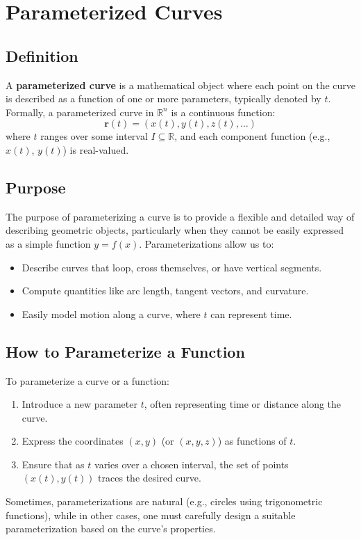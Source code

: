 \section{Parameterized Curves}

\subsection{Definition}
A \textbf{parameterized curve} is a mathematical object where each point on the curve is described as a function of one or more parameters, typically denoted by \( t \). Formally, a parameterized curve in \( \mathbb{R}^n \) is a continuous function:
\[
\mathbf{r}(t) = (x(t), y(t), z(t), \ldots)
\]
where \( t \) ranges over some interval \( I \subseteq \mathbb{R} \), and each component function (e.g., \( x(t) \), \( y(t) \)) is real-valued.

\subsection{Purpose}
The purpose of parameterizing a curve is to provide a flexible and detailed way of describing geometric objects, particularly when they cannot be easily expressed as a simple function \( y = f(x) \). Parameterizations allow us to:
\begin{itemize}[label=\(-\)]
    \item Describe curves that loop, cross themselves, or have vertical segments.
    \item Compute quantities like arc length, tangent vectors, and curvature.
    \item Easily model motion along a curve, where \( t \) can represent time.
\end{itemize}

\subsection{How to Parameterize a Function}
To parameterize a curve or a function:
\begin{enumerate}
    \item Introduce a new parameter \( t \), often representing time or distance along the curve.
    \item Express the coordinates \( (x, y) \) (or \( (x, y, z) \)) as functions of \( t \).
    \item Ensure that as \( t \) varies over a chosen interval, the set of points \( (x(t), y(t)) \) traces the desired curve.
\end{enumerate}
Sometimes, parameterizations are natural (e.g., circles using trigonometric functions), while in other cases, one must carefully design a suitable parameterization based on the curve's properties.

